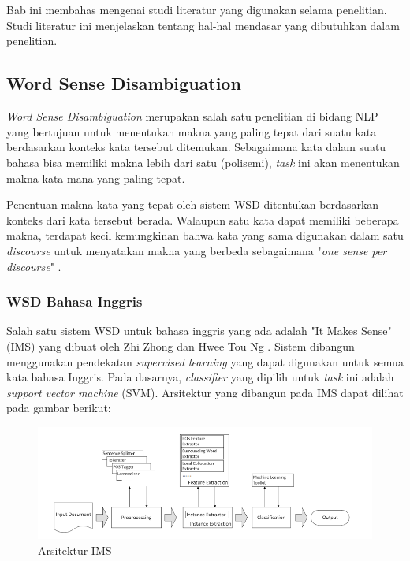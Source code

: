 \chapter{\babDua}
Bab ini membahas mengenai studi literatur yang digunakan selama penelitian. Studi literatur ini menjelaskan tentang hal-hal mendasar yang dibutuhkan dalam penelitian.

\section{Word Sense Disambiguation}
\textit{Word Sense Disambiguation} merupakan salah satu penelitian di bidang NLP yang bertujuan untuk menentukan makna yang paling tepat dari suatu kata berdasarkan konteks kata tersebut ditemukan. Sebagaimana kata dalam suatu bahasa bisa memiliki makna lebih dari satu (polisemi), \textit{task} ini akan menentukan makna kata mana yang paling tepat.

Penentuan makna kata yang tepat oleh sistem WSD ditentukan berdasarkan konteks dari kata tersebut berada. Walaupun satu kata dapat memiliki beberapa makna, terdapat kecil kemungkinan bahwa kata yang sama digunakan dalam satu \textit{discourse} untuk menyatakan makna yang berbeda sebagaimana "\textit{one sense per discourse}" \citep{gale1992one}.

\subsection{WSD Bahasa Inggris}
Salah satu sistem WSD untuk bahasa inggris yang ada adalah "It Makes Sense" (IMS) yang dibuat oleh Zhi Zhong dan Hwee Tou Ng \citep{zhong2010makes}. Sistem  dibangun menggunakan pendekatan \textit{supervised learning} yang dapat digunakan untuk semua kata bahasa Inggris. Pada dasarnya, \textit{classifier} yang dipilih untuk \textit{task} ini adalah \textit{support vector machine} (SVM). Arsitektur yang dibangun pada IMS dapat dilihat pada gambar berikut:

\begin{figure}
	\centering
	\includegraphics[width=1\linewidth]{adit_pics/Arsitektur-IMS}
	\caption{Arsitektur IMS}
	\label{fig:Arsitektur-IMS}
\end{figure}

